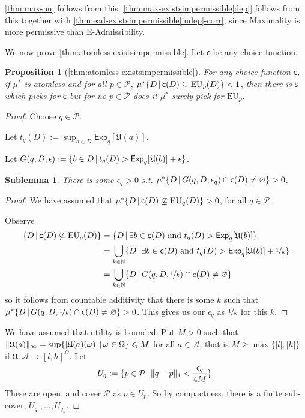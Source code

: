 \documentclass[a4paper,final]{article}
\newtheorem{proposition}[theorem]{Proposition}
\newtheorem{sublemma}{Sublemma}[theorem]
\newcommand\A{\mathcal{A}}
\newcommand\Prob{\mathcal{P}} %
\newcommand\Exp{\mathsf{Exp}}
\newcommand\EU{\mathrm{EU}}
\newcommand\U{\mathfrak{U}} %
\newcommand\s{\mathsf{s}}
\renewcommand\c{\mathsf{c}} %
\renewcommand{\color}[1]{}
\newenvironment{colored}[1]{\leavevmode\color{#1}}{}
\newcommand\SetDelimiter[1][]{
	\nonscript\,#1\vert \allowbreak \nonscript\,\mathopen{}}
\providecommand\given{\SetDelimiter}
\renewcommand{\emptyset}{\varnothing}
\renewcommand{\leq}{\leqslant}
\renewcommand{\geq}{\geqslant}
\newenvironment{CCM rewritten}
{\begingroup\color{blue}} %
{\endgroup}              %
\begin{document}
\begin{colored}{blue}

\cref{thm:max-nu} follows from this. \cref{thm:max-existsimpermissible[dep]} follows from this together with \cref{thm:ead-existsimpermissible[indep]-corr}, since Maximality is more permissive than E-Admissibility.



We now prove \cref{thm:atomless-existsimpermissible}. Let $\c$ be any choice function. 


\begin{proposition}[\cref{thm:atomless-existsimpermissible}]
	For any choice function $\c$, if $\mu^*$ is atomless and for all $p\in\Prob$, $\mu^*\{D\given \c(D)\subseteq\EU_p(D)\}<1$, then there is $\s$ which picks for $\c$ but for no $p\in\Prob$ does it $\mu^*$-surely pick for $\EU_p$. 
\end{proposition}
\begin{proof}
	
	Choose $q\in\Prob$.
	
	Let $t_q(D):=\sup_{a \in D} \Exp_q[\U(a)]$.
	
	Let $G(q,D,\epsilon):=\{b\in D\given t_q(D)>\Exp_q[\U(b)]+\epsilon\}$. 
	
	  \begin{sublemma}
		There is some $\epsilon_q>0$ s.t. $\mu^*\{D\given G(q,D,\epsilon_q)\cap\c(D)\neq \emptyset\}>0$. 
	\end{sublemma}
	\begin{proof}
		We have assumed that $\mu^*\{D\given \c(D)\not \subseteq\EU_q(D)\}>0$, for all $q\in\Prob$.
		 
		Observe
		\begin{align}
			\{D\given \c(D)\not\subseteq\EU_q(D)\}&=\{D\given\exists b\in\c(D)\text{ and }t_q(D)>\Exp_q[\U(b)] \}\\
			&=\bigcup_{k\in\mathbb{N}}\{D\given\exists b\in \c(D)\text{ and }t_q(D)>\Exp_q[\U(b)]+\nicefrac{1}{k} \}\\
			&=\bigcup_{k\in\mathbb{N}}\{D\given G(q,D,\nicefrac{1}{k})\cap c(D)\neq \emptyset\}
		\end{align}
		so it follows from countable additivity that there is some $k$ such that $\mu^*\{D\given G(q,D,\nicefrac{1}{k})\cap\c(D)\neq \emptyset\}>0$. This gives us our $\epsilon_q$ as $\nicefrac{1}{k}$ for this $k$. 
	\end{proof}
	
	
	We have assumed that utility is bounded. Put $M>0$ such that $\|\U(a)\|_\infty=\sup\{|\U(a)(\omega)|\given \omega\in\Omega\}\leq M$ for all $a\in\A$, that is $M\geq\max\{|l|,|h|\}$ if $\U:\A\to[l,h]^\Omega$. 	Let $$U_q:=\{p\in\Prob\given \|q-p\|_1<\frac{\epsilon_q}{4M}\}.$$
	These are open, and cover $\Prob$ as $p\in U_p$. 
	So by compactness, there is a finite sub-cover, $U_{q_1},\ldots, U_{q_n}$. 
	

\end{proof}
\end{colored}
\end{document}
